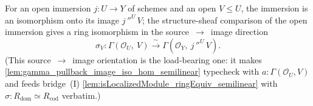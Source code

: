 \begin{definition}
  \label{def:gamma_image_ring_equiv}
  For an open immersion \(j : U \to Y\) of schemes and an open \(V \le U\), the immersion is an isomorphism
  onto its image \(j\,''^{U}\,V\); the structure-sheaf comparison of the open immersion gives a ring
  isomorphism in the source~\(\to\)~image direction
  \[
    \sigma_{V} : \Gamma(\mathcal{O}_U,\ V) \xrightarrow{\ \sim\ } \Gamma(\mathcal{O}_Y,\ j\,''^{U}\,V).
  \]
  (This source~\(\to\)~image orientation is the load-bearing one: it makes
  \cref{lem:gamma_pullback_image_iso_hom_semilinear} typecheck with \(a : \Gamma(\mathcal{O}_U, V)\) and
  feeds bridge~(I) \cref{lem:isLocalizedModule_ringEquiv_semilinear} with \(\sigma : R_{\mathrm{dom}} \simeq
  R_{\mathrm{cod}}\) verbatim.)
\end{definition}


